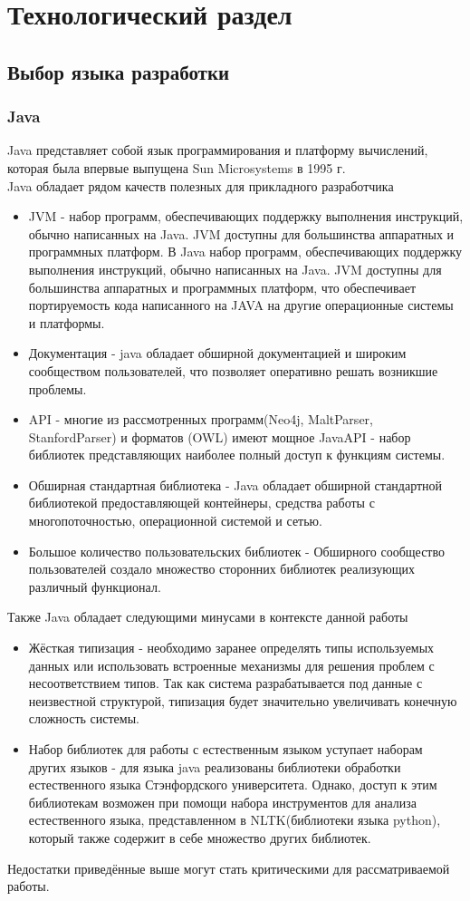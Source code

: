 \chapter{Технологический раздел}
\label{cha:impl}
\section{Выбор языка разработки}
\subsection{Java}
Java представляет собой язык программирования и платформу вычислений, которая была впервые выпущена Sun Microsystems в 1995 г.\cite{java}\\
Java обладает рядом качеств полезных для прикладного разработчика
\begin{itemize}
\item JVM - набор программ, обеспечивающих поддержку выполнения инструкций, обычно написанных на Java. JVM доступны для большинства аппаратных и программных платформ. В Java набор программ, обеспечивающих поддержку выполнения инструкций, обычно написанных на Java. JVM доступны для большинства аппаратных и программных платформ, что обеспечивает портируемость кода написанного на JAVA на другие операционные системы и платформы. 
\item Документация - java обладает обширной документацией и широким сообществом пользователей, что позволяет оперативно решать возникшие проблемы.
\item API - многие из рассмотренных программ(Neo4j, MaltParser, StanfordParser) и форматов  (OWL) имеют мощное JavaAPI - набор библиотек представляющих наиболее полный доступ к функциям системы.
\item Обширная стандартная библиотека - Java обладает обширной стандартной библиотекой предоставляющей контейнеры, средства работы с многопоточностью, операционной системой и сетью. 
\item Большое количество пользовательских библиотек - Обширного сообщество пользователей создало множество сторонних библиотек реализующих различный функционал.
\end{itemize}
Также Java обладает следующими минусами в контексте данной работы 
\begin{itemize}
\item Жёсткая типизация - необходимо заранее определять типы используемых данных или использовать встроенные механизмы для решения проблем с несоответствием типов. Так как система разрабатывается под данные с неизвестной структурой, типизация будет значительно увеличивать конечную сложность системы.
\item Набор библиотек для работы с естественным языком уступает наборам других языков - для языка java реализованы библиотеки обработки естественного языка Стэнфордского университета. Однако, доступ к этим библиотекам возможен при помощи набора инструментов для анализа естественного языка, представленном в NLTK(библиотеки языка python), который также содержит в себе множество других библиотек. 
\end{itemize}
Недостатки приведённые выше могут стать критическими для рассматриваемой работы.
